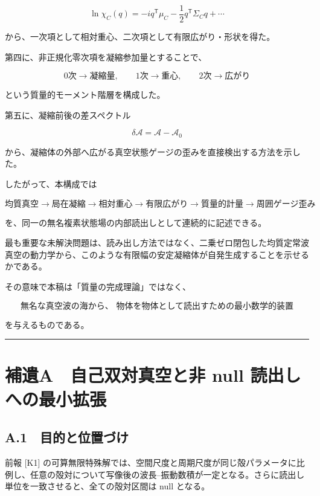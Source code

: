 \documentclass[
  a4paper,
]{ltjsarticle}
\begin{document}
\[
\ln\chi_C(q)
=
-iq^{\mathsf T}\mu_C
-
\frac12q^{\mathsf T}\Sigma_Cq
+
\cdots
\]

から、一次項として相対重心、二次項として有限広がり・形状を得た。

第四に、非正規化零次項を凝縮参加量とすることで、

\[
\boxed{
0\text{次}
\to
\text{凝縮量},
\qquad
1\text{次}
\to
\text{重心},
\qquad
2\text{次}
\to
\text{広がり}
}
\]

という質量的モーメント階層を構成した。

第五に、凝縮前後の差スペクトル

\[
\delta\mathcal A
=
\mathcal A-\mathcal A_0
\]

から、凝縮体の外部へ広がる真空状態ゲージの歪みを直接検出する方法を示した。

したがって、本構成では

\[
\boxed{
\text{均質真空}
\rightarrow
\text{局在凝縮}
\rightarrow
\text{相対重心}
\rightarrow
\text{有限広がり}
\rightarrow
\text{質量的計量}
\rightarrow
\text{周囲ゲージ歪み}
}
\]

を、同一の無名複素状態場の内部読出しとして連続的に記述できる。

最も重要な未解決問題は、読み出し方法ではなく、二乗ゼロ閉包した均質定常波真空の動力学から、このような有限幅の安定凝縮体が自発生成することを示せるかである。

その意味で本稿は「質量の完成理論」ではなく、

\[
\boxed{
\text{無名な真空波の海から、
物体を物体として読出すための最小数学的装置}
}
\]

を与えるものである。

\begin{center}\rule{0.5\linewidth}{0.5pt}\end{center}

\section{補遺A　自己双対真空と非 null
読出しへの最小拡張}\label{ux88dcux907aa-ux81eaux5df1ux53ccux5bfeux771fux7a7aux3068ux975e-null-ux8aadux51faux3057ux3078ux306eux6700ux5c0fux62e1ux5f35}

\subsection{A.1　目的と位置づけ}\label{a.1-ux76eeux7684ux3068ux4f4dux7f6eux3065ux3051}

前報 {[}K1{]}
の可算無限特殊解では、空間尺度と周期尺度が同じ殻パラメータに比例し、任意の殻対について写像後の波長--振動数積が一定となる。さらに読出し単位を一致させると、全ての殻対区間は
null となる。
\end{document}
